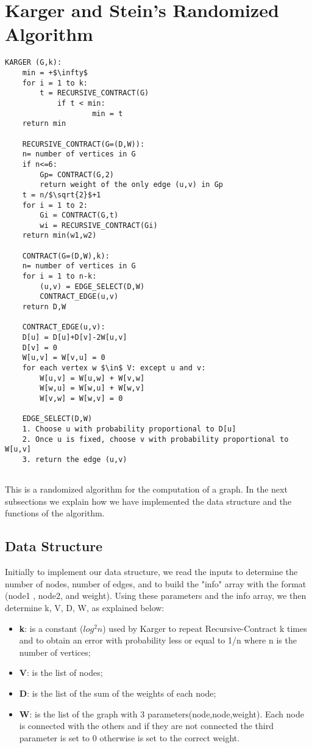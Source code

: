 \section{Karger and Stein's Randomized Algorithm}\label{karger}

\begin{lstlisting}[mathescape=true]
	KARGER (G,k):
	min = +$\infty$
	for i = 1 to k:		
		t = RECURSIVE_CONTRACT(G)		
			if t < min:
					min = t
	return min
	
	RECURSIVE_CONTRACT(G=(D,W)):
	n= number of vertices in G
	if n<=6:
		Gp= CONTRACT(G,2)
		return weight of the only edge (u,v) in Gp
	t = n/$\sqrt{2}$+1
	for i = 1 to 2:
		Gi = CONTRACT(G,t)
		wi = RECURSIVE_CONTRACT(Gi)
	return min(w1,w2)
	
	CONTRACT(G=(D,W),k):
	n= number of vertices in G
	for i = 1 to n-k:
		(u,v) = EDGE_SELECT(D,W)
		CONTRACT_EDGE(u,v)
	return D,W
	
	CONTRACT_EDGE(u,v):
	D[u] = D[u]+D[v]-2W[u,v]
	D[v] = 0
	W[u,v] = W[v,u] = 0
	for each vertex w $\in$ V: except u and v:
		W[u,v] = W[u,w] + W[v,w]
		W[w,u] = W[w,u] + W[w,v]
		W[v,w] = W[w,v] = 0
		
	EDGE_SELECT(D,W)
	1. Choose u with probability proportional to D[u]
	2. Once u is fixed, choose v with probability proportional to W[u,v]
	3. return the edge (u,v)
	
\end{lstlisting}

This is a randomized algorithm for the computation of a graph.
In the next subsections we explain how we have implemented the data structure and the functions of the algorithm.

\pagebreak

\subsection{Data Structure}
Initially to implement our data structure, we read the inputs to determine the number of nodes, number of edges, and to build the "info" array with the format (node1 , node2, and weight).
Using these parameters and the info array, we then determine k, V, D, W, as explained below:
\begin{itemize}
	\item  \textbf{k}: is a constant ($log^2n$) used by Karger to repeat Recursive-Contract k times and to obtain an error with probability less or equal to 1/n where n is the number of vertices;
	\item  \textbf{V}: is the list of nodes;
	\item  \textbf{D}: is the list of the sum of the weights of each node;
	\item  \textbf{W}: is the list of the graph with 3 parameters(node,node,weight). Each node is connected with the others and if they are not connected the third parameter is set to 0 otherwise is set to the correct weight.
\end{itemize}


